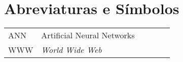 \chapter*{Abreviaturas e Símbolos}

\begin{flushleft}
\begin{tabular}{l p{0.8\linewidth}}
ANN      & Artificial Neural Networks\\
WWW      & \emph{World Wide Web}
\end{tabular}
\end{flushleft}


